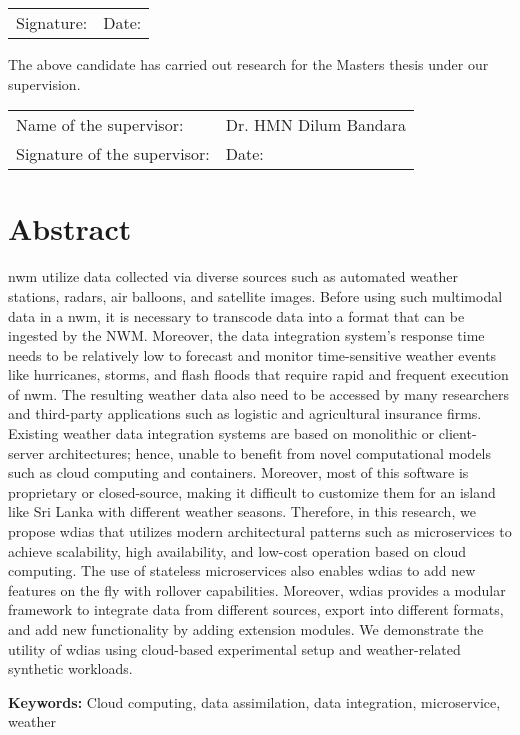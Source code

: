 \documentclass[a4paper,oneside,12pt]{report}
\begin{document}
\vspace{0.5in}
\noindent
\begin{tabu} to 1.0\textwidth { X[l] X[l] }
  Signature: & Date:
\end{tabu}



\vspace{0.5in}
\noindent
The above candidate has carried out research for the Masters thesis under our supervision.


\vspace{0.5in}
\noindent
\begin{tabu} to 1.0\textwidth { X[l] X[l] }
  Name of the supervisor: & Dr. HMN Dilum Bandara\\ [1.5ex]
  Signature of the supervisor: & Date:
\end{tabu}

\restoregeometry
\normalsize

{ 

\chapter*{Abstract}

\acrfull{nwm} utilize data collected via diverse sources such as automated weather stations, radars, air balloons, and satellite images. Before using such multimodal data in a \acrshort{nwm}, it is necessary to transcode data into a format that can be ingested by the NWM. Moreover, the data integration system's response time needs to be relatively low to forecast and monitor time-sensitive weather events like hurricanes, storms, and flash floods that require rapid and frequent execution of \acrshort{nwm}. The resulting weather data also need to be accessed by many researchers and third-party applications such as logistic and agricultural insurance firms.
Existing weather data integration systems are based on monolithic or client-server architectures; hence, unable to benefit from novel computational models such as cloud computing and containers. Moreover, most of this software is proprietary or closed-source, making it difficult to customize them for an island like Sri Lanka with different weather seasons.
Therefore, in this research, we propose \acrfull{wdias} that utilizes modern architectural patterns such as microservices to achieve scalability, high availability, and low-cost operation based on cloud computing. The use of stateless microservices also enables \acrshort{wdias} to add new features on the fly with rollover capabilities. Moreover, \acrshort{wdias} provides a modular framework to integrate data from different sources, export into different formats, and add new functionality by adding extension modules.
We demonstrate the utility of \acrshort{wdias} using cloud-based experimental setup and weather-related synthetic workloads.

\vspace{4mm}

\textbf{Keywords:} Cloud computing, data assimilation, data integration, microservice, weather
}
\end{document}

